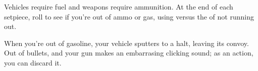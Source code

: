 
Vehicles require fuel and weapons require ammunition. At the end of each setpiece, roll to see if you're out of ammo or gas, using  versus the  of not running out.

When you're out of gasoline, your vehicle sputters to a halt, leaving its convoy. Out of bullets, and your gun makes an embarrasing clicking sound; as an action, you can discard it.
